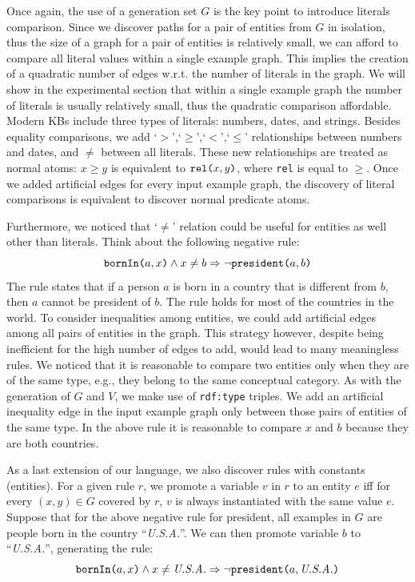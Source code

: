 Once again, the use of a generation set $G$ is the key point to introduce literals comparison.
Since we discover paths for a pair of entities from $G$ in isolation, thus the size of a graph for a pair of entities is relatively small, we can afford to compare all literal values within a single example graph. This implies the creation of a quadratic number of edges w.r.t. the number of literals in the graph. We will show in the experimental section that within a single example graph the number of literals is usually relatively small, thus the quadratic comparison affordable. Modern KBs include three types of literals: numbers, dates, and strings. Besides equality comparisons, we add `$>$',`$\geq$',`$<$',`$\leq$' relationships between numbers and dates, and $\neq$ between all literals. These new relationships are treated as normal atoms: $x \geq y$ is equivalent to $\texttt{rel(}x,y\texttt{)}$, where \texttt{rel} is equal to $\geq$. Once we added  artificial edges for every input example graph, the discovery of literal comparisons is equivalent to discover normal predicate atoms.

Furthermore, we noticed that `$\neq$' relation could be useful for entities as well other than literals. Think about the following negative rule:
$$ \texttt{bornIn(}a,x\texttt{)} \wedge x \neq b \Rightarrow \neg \texttt{president(}a,b\texttt{)} $$
The rule states that if a person $a$ is born in a country that is different from $b$, then $a$ cannot be president of $b$.
The rule holds for most of the countries in the world. To consider inequalities among entities, we could add artificial edges among all pairs of entities in the graph. This strategy however, despite being inefficient for the high number of edges to add, would lead to many meaningless rules. We noticed that it is reasonable to compare two entities only when they are of the same type, e.g., they belong to the same conceptual category. As with the generation of $G$ and $V$, we make use of \texttt{rdf:type} triples. We add an artificial inequality edge in the input example graph only between those pairs of entities of the same type. In the above rule it is reasonable to compare $x$ and $b$ because they are both countries.

As a last extension of our language, we also discover rules with constants (entities). For a given rule $r$, we promote a variable $v$ in $r$ to an entity $e$ iff for every $(x,y) \in G$ covered by $r$, $v$ is always instantiated with the same value $e$. Suppose that for the above negative rule for president, all examples in $G$ are people born in the country ``\textit{U.S.A.}''. We can then promote variable $b$ to ``\textit{U.S.A.}'', generating the rule:
$$ \texttt{bornIn(}a,x\texttt{)} \wedge x \neq \emph{U.S.A.} \Rightarrow \neg \texttt{president(}a,\emph{U.S.A.}\texttt{)} $$